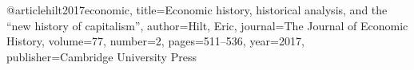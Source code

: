 @article{hilt2017economic,
	title={Economic history, historical analysis, and the “new history of capitalism”},
	author={Hilt, Eric},
	journal={The Journal of Economic History},
	volume={77},
	number={2},
	pages={511--536},
	year={2017},
	publisher={Cambridge University Press}
}


